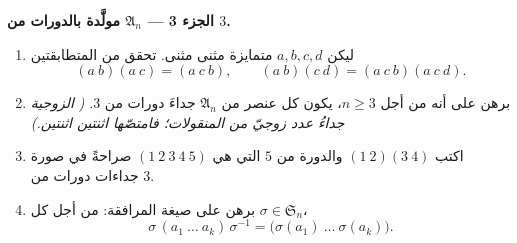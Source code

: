 \begin{problem}
\medskip
\noindent\textbf{الجزء 3 ---  $\mathfrak A_n$ مولَّدة
بالدورات من  $3$.}
\begin{enumerate}[resume]
  \item ليكن $a, b, c, d$ متمايزة مثنى مثنى. تحقق من المتطابقتين
        \[
        (a\ b)(a\ c) = (a\ c\ b),
        \qquad
        (a\ b)(c\ d) = (a\ c\ b)(a\ c\ d) .
        \]
  \item برهن على أنه من أجل $n \geq 3$، يكون كل عنصر من $\mathfrak
        A_n$ جداءَ دورات من  $3$. \emph{(
        الزوجية جداءُ عدد زوجيّ من
        المنقولات؛ فامتصّها اثنتين اثنتين.)}
  \item اكتب $(1\ 2)(3\ 4)$ والدورة من  $5$ التي هي $(1\ 2\ 3\ 4\ 5)$
        صراحةً في صورة جداءات دورات من  $3$.
  \item برهن على صيغة المرافقة: من أجل كل $\sigma \in
        \mathfrak S_n$،
        \[
        \sigma\,(a_1\ \dots\ a_k)\,\sigma^{-1}
        = \bigl(\sigma(a_1)\ \dots\ \sigma(a_k)\bigr) .
        \]
\end{enumerate}


\end{problem}
